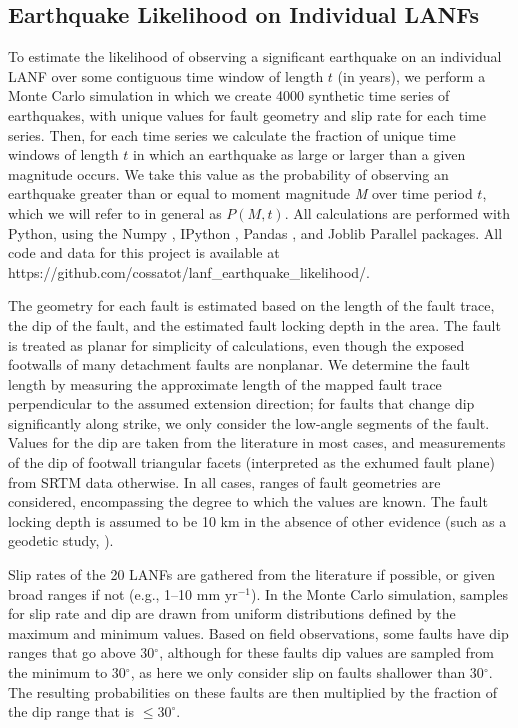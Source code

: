 \documentclass[draft,grl]{AGUTeX}
\begin{document}
\begin{article}
\subsection{Earthquake Likelihood on Individual LANFs}
To estimate the likelihood of observing a significant earthquake on an
individual LANF over some contiguous time window of length $t$ (in years), we
perform a Monte Carlo simulation in which we create 4000 synthetic time series
of earthquakes, with unique values for fault geometry and slip rate for each
time series. Then, for each time series we calculate the fraction of unique
time windows of length $t$ in which an earthquake as large or larger than
a given magnitude occurs.  We take this value as the probability of observing
an earthquake greater than or equal to moment magnitude \emph{M} over time
period $t$, which we will refer to in general as $P(M,t)$.  All calculations
are performed with Python, using the Numpy \citep{oliphant2007numpy}, IPython
\citep{perez2007ipython}, Pandas \citep{mckinney-proc-scipy-2010}, and Joblib
Parallel \citep{varoquaux_joblib} packages.  All code and data for this project
is available at https://github.com/cossatot/lanf\_earthquake\_likelihood/.

The geometry for each fault is estimated based on the length of the fault
trace, the dip of the fault, and the estimated fault locking depth in the area.
The fault is treated as planar for simplicity of calculations, even though the
exposed footwalls of many detachment faults are nonplanar.  We determine the
fault length by measuring the approximate length of the mapped fault trace
perpendicular to the assumed extension direction; for faults that change dip
significantly along strike, we only consider the low-angle segments of the
fault.  Values for the dip are taken from the literature in most cases, and
measurements of the dip of footwall triangular facets (interpreted as the
exhumed fault plane) from SRTM data otherwise. In all cases, ranges of fault
geometries are considered, encompassing the degree to which the values are
known. The fault locking depth is assumed to be 10 km in the absence of other
evidence (such as a geodetic study, \citep[e.g.,][]{hreinsdottir2009altotib}).

Slip rates of the 20 LANFs are gathered from the literature if possible, or
given broad ranges if not (e.g., 1--10 mm yr$^{-1}$).  In the Monte Carlo
simulation, samples for slip rate and dip are drawn from uniform distributions
defined by the maximum and minimum values.  Based on field observations, some
faults have dip ranges that go above 30$^\circ$, although for these faults dip
values are sampled from the minimum to 30$^\circ$, as here we only consider
slip on faults shallower than 30$^\circ$. The resulting probabilities on these
faults are then multiplied by the fraction of the dip range that is
$\le30^\circ$.


\end{article}
\end{document}
